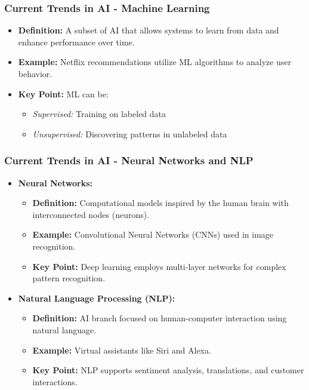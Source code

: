 \documentclass[aspectratio=169]{beamer}
\begin{document}
\begin{frame}[fragile]
    \frametitle{Current Trends in AI - Machine Learning}
    \begin{itemize}
        \item \textbf{Definition:} 
        A subset of AI that allows systems to learn from data and enhance performance over time.
        
        \item \textbf{Example:} 
        Netflix recommendations utilize ML algorithms to analyze user behavior.
        
        \item \textbf{Key Point:} 
        ML can be:
        \begin{itemize}
            \item \textit{Supervised:} Training on labeled data
            \item \textit{Unsupervised:} Discovering patterns in unlabeled data
        \end{itemize}
    \end{itemize}
\end{frame}

\begin{frame}[fragile]
    \frametitle{Current Trends in AI - Neural Networks and NLP}
    \begin{itemize}
        \item \textbf{Neural Networks:}
        \begin{itemize}
            \item \textbf{Definition:} Computational models inspired by the human brain with interconnected nodes (neurons).
            \item \textbf{Example:} Convolutional Neural Networks (CNNs) used in image recognition.
            \item \textbf{Key Point:} Deep learning employs multi-layer networks for complex pattern recognition.
        \end{itemize}

        \item \textbf{Natural Language Processing (NLP):}
        \begin{itemize}
            \item \textbf{Definition:} AI branch focused on human-computer interaction using natural language.
            \item \textbf{Example:} Virtual assistants like Siri and Alexa.
            \item \textbf{Key Point:} NLP supports sentiment analysis, translations, and customer interactions.
        \end{itemize}
    \end{itemize}
\end{frame}
\end{document}
